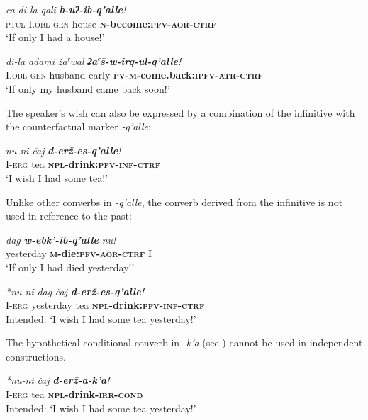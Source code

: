 ﻿\documentclass[output=paper]{langsci/langscibook}
\begin{document}
\ea %
\gll \emph{ca} \emph{di-la} \emph{qali} \emph{\textbf{b-uʔ-ib-q'alle}!}\\
 \textsc{ptcl} I.\textsc{obl}-\textsc{gen} house \textbf{\textsc{n}-become:\textsc{pfv}-\textsc{aor}-\textsc{ctrf}}\\
\glt `If only I had a house!'

\ex %
\gll \emph{di-la} \emph{adami} \emph{žaˤwal} \emph{\textbf{ʡaˤš-w-irq-ul-q'alle}!}\\
 I.\textsc{obl}-\textsc{gen} husband early \textbf{\textsc{pv}-\textsc{m}-come.back:\textsc{ipfv}-\textsc{atr}-\textsc{ctrf}}\\
\glt `If only my husband came back soon!'
\z

The speaker's wish can also be expressed by a combination of the
infinitive with the counterfactual marker \emph{-q'alle}:

\ea %
\gll \emph{nu-ni} \emph{čaj} \emph{\textbf{d-erž-es-q'alle}!}\\
 I-\textsc{erg} tea \textbf{\textsc{npl}-drink:\textsc{pfv}-\textsc{inf}-\textsc{ctrf}}\\
\glt `I wish I had some tea!'
\z

Unlike other {converbs} in \emph{-q'alle}, the converb derived from the 
infinitive is not used in reference to the past:

\largerpage

\ea %
\gll \emph{dag} \emph{\textbf{w-ebk'-ib-q'alle}} \emph{nu!}\\
 yesterday \textbf{\textsc{m}-die:\textsc{pfv}-\textsc{aor}-\textsc{ctrf}} I\\
\glt `If only I had died yesterday!'

\ex %
\gll \emph{*nu-ni} \emph{dag} \emph{čaj} \emph{\textbf{d-erž-es-q'alle}!}\\
 I-\textsc{erg} yesterday tea \textbf{\textsc{npl}-drink:\textsc{pfv}-\textsc{inf}-\textsc{ctrf}}\\
\glt Intended: `I wish I had some tea yesterday!'
\z

The hypothetical conditional converb in \emph{-k'a} (see )
cannot be used in independent constructions.

\ea %
\gll \emph{*nu-ni} \emph{čaj} \emph{\textbf{d-erž-a-k'a}!}\\
 I-\textsc{erg} tea \textbf{\textsc{npl}-drink-\textsc{irr}-\textsc{cond}}\\
\glt Intended: `I wish I had some tea yesterday!'
\end{document}
